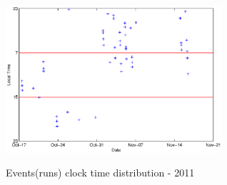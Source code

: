 \documentclass[a4paper,11pt]{article}
\begin{document}
\begin{figure}[htbp]
\begin{minipage}{1.0\hsize}
\begin{center}
\\
\end{center}
\end{minipage}
\begin{minipage}{1.0\hsize}
\begin{center}
\includegraphics[width =8cm]{PlotTime2011_4.eps}
\\
\caption{Events(runs) clock time distribution - 2011}
\end{center}
\end{minipage}
\end{figure}


 
\end{document}
